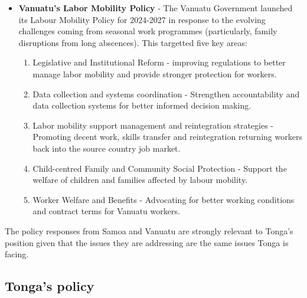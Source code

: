 \documentclass[9pt,a4paper,twocolumn,twoside]{tau-class/tau}
\begin{document}
\begin{itemize}
\item \textbf{Vanuatu's Labor Mobility Policy} - The Vanuatu Government launched its Labour Mobility Policy for 2024-2027 in response to the evolving challenges coming from seasonal work programmes (particularly, family disruptions from long abscences). This targetted five key areas:
\begin{enumerate}
    \item Legislative and Institutional Reform - improving regulations to better manage labor mobility and provide stronger protection for workers.
    \item Data collection and systems coordination - Strengthen accountability and data collection systems for better informed decision making.
    \item Labor mobility support management and reintegration strategies - Promoting decent work, skills transfer and reintegration returning workers back into the source country job market.
    \item Child-centred Family and Community Social Protection - Support the welfare of children and families affected by labour mobility.
    \item Worker Welfare and Benefits - Advocating for better working conditions and contract terms for Vanuatu workers.
\end{enumerate}

\end{itemize}

The policy responses from Samoa and Vanuatu are strongly relevant to Tonga's position given that the issues they are addressing are the same issues Tonga is facing.


\subsection{Tonga's policy}
\end{document}
